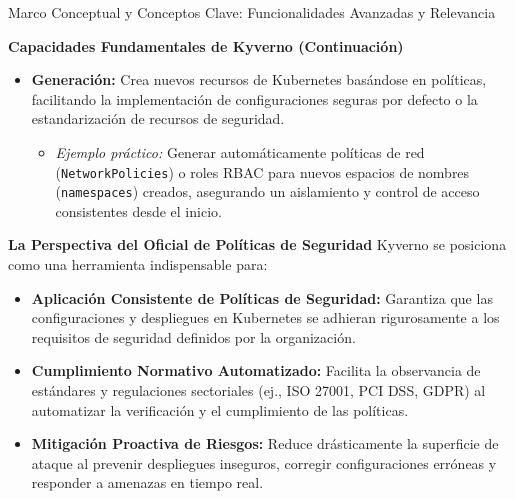 \documentclass[aspectratio=169]{beamer}
\begin{document}
\begin{frame}{Marco Conceptual y Conceptos Clave: Funcionalidades Avanzadas y Relevancia}


\textbf{Capacidades Fundamentales de Kyverno (Continuación)}
\begin{itemize}
  \item \textbf{Generación:} Crea nuevos recursos de Kubernetes basándose en políticas, facilitando la implementación de configuraciones seguras por defecto o la estandarización de recursos de seguridad.
  \begin{itemize}
    \item \textit{Ejemplo práctico:} Generar automáticamente políticas de red (\texttt{NetworkPolicies}) o roles RBAC para nuevos espacios de nombres (\texttt{namespaces}) creados, asegurando un aislamiento y control de acceso consistentes desde el inicio.
  \end{itemize}
\end{itemize}
\textbf{La Perspectiva del Oficial de Políticas de Seguridad}
Kyverno se posiciona como una herramienta indispensable para:
\begin{itemize}
  \item \textbf{Aplicación Consistente de Políticas de Seguridad:} Garantiza que las configuraciones y despliegues en Kubernetes se adhieran rigurosamente a los requisitos de seguridad definidos por la organización.
  \item \textbf{Cumplimiento Normativo Automatizado:} Facilita la observancia de estándares y regulaciones sectoriales (ej., ISO 27001, PCI DSS, GDPR) al automatizar la verificación y el cumplimiento de las políticas.
  \item \textbf{Mitigación Proactiva de Riesgos:} Reduce drásticamente la superficie de ataque al prevenir despliegues inseguros, corregir configuraciones erróneas y responder a amenazas en tiempo real.
\end{itemize}
\end{frame}
\end{document}
